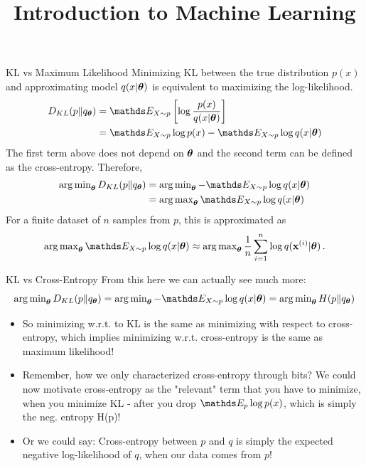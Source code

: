 \documentclass[11pt,compress,t,notes=noshow, xcolor=table]{beamer}
\title{Introduction to Machine Learning}
\date{}
\begin{document}



\begin{vbframe}{KL vs Maximum Likelihood}
Minimizing KL between the true distribution $p(x)$ and approximating model $q(x|\bm{\theta})$ is equivalent to maximizing the log-likelihood.
  \begin{align*}
    D_{KL}(p \| q_{\thetab}) &= \E_{X \sim p} \left[ \log \frac{p(x)}{q(x|\thetab)}\right] \\
     &= \E_{X \sim p} \log p(x) - \E_{X \sim p} \log q(x|\thetab)
  \end{align*}
  The first term above does not depend on $\bm{\theta}$ and the second term can be defined as the cross-entropy. Therefore,
  \begin{align*}
    \argmin_{\thetab} D_{KL}(p \| q_{\thetab}) &= \argmin_{\thetab} -\E_{X \sim p} \log q(x|\thetab)\\ 
                                           &= \argmax_{\thetab} \E_{X \sim p} \log q(x|\thetab)
  \end{align*}
  For a finite dataset of $n$ samples from $p$, this is approximated as 
  $$\argmax_{\thetab} \E_{X \sim p} \log q(x|\thetab) \approx \argmax_{\thetab} \frac{1}{n} \sumin \log q(\xi|\thetab)\,.$$

\end{vbframe}

\begin{vbframe}{KL vs Cross-Entropy}
From this here we can actually see much more:
$$ \argmin_{\thetab} D_{KL}(p \| q_{\thetab}) = \argmin_{\thetab} -\E_{X \sim p} \log q(x|\thetab) = \argmin_{\thetab} H(p \| q_{\thetab}) $$
  \begin{itemize}
    \item So minimizing w.r.t. to KL is the same as minimizing with respect to cross-entropy, which implies minimizing w.r.t. cross-entropy is the same as maximum likelihood!
    \item Remember, how we only characterized cross-entropy through bits? We could now motivate cross-entropy as the "relevant" term that you have to minimize, when you minimize KL - after you drop $\E_p \log p(x)$, which is simply the neg. entropy H(p)!
    \item Or we could say: Cross-entropy between $p$ and $q$ is simply the expected negative log-likelihood of $q$, when our data comes from $p$!
  \end{itemize}
\end{vbframe}
\end{document}
